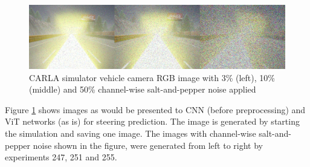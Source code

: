 





\begin{figure}[H]
    \centering
    \includegraphics[width=1.0\linewidth]{Figures/Results/experiment-247-251-255-3pc-10pc-50pc-rbg-pepper-noise-combined.jpg}
    \caption{CARLA simulator vehicle camera RGB image with 3\% (left), 10\% (middle) and 50\% channel-wise salt-and-pepper noise applied}
    \label{fig:experiment-247-251-255-3pc-10pc-50pc-rbg-pepper-noise-combined}
\end{figure}

Figure \ref{fig:experiment-247-251-255-3pc-10pc-50pc-rbg-pepper-noise-combined} shows images as would be presented to CNN (before preprocessing) and ViT networks (as is) for steering prediction. The image is generated by starting the simulation and saving one image. The images with channel-wise salt-and-pepper noise shown in the figure, were generated from left to right by experiments 247, 251 and 255.

